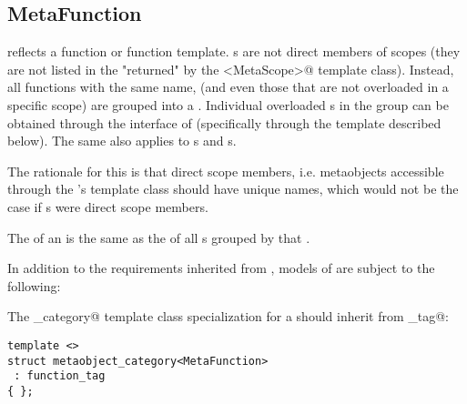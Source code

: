 \subsection{MetaFunction}
\label{concept-MetaFunction}



 reflects a function or function template.
s are not direct members of scopes (they are not listed in the 
"returned" by the \verb@members<MetaScope>@ template class).
Instead, all functions with the same name, (and even those that are not
overloaded in a specific scope) are grouped into a . Individual overloaded s
in the group can be obtained through the interface of  (specifically through the
\verb@overloads@ template described below). The same also applies to s and s.

The rationale for this is that direct scope members, i.e. metaobjects accessible through the 's
\verb@members@ template class should have unique names, which would not be the case if s
were direct scope members.

The \verb@scope@ of an  is the same as the \verb@scope@
of all s grouped by that .

In addition to the requirements inherited from ,
models of  are subject to the following:

The \verb@metaobject_category@ template class specialization for a  should
inherit from \verb@function_tag@:

\begin{verbatim}
template <>
struct metaobject_category<MetaFunction>
 : function_tag
{ };
\end{verbatim}

